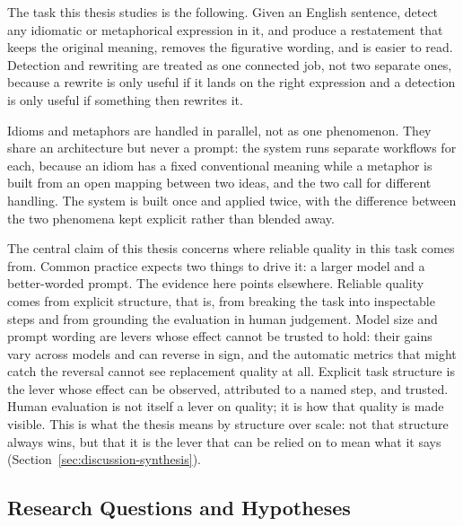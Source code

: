 The task this thesis studies is the following. Given an English sentence,
detect any idiomatic or metaphorical expression in it, and produce a
restatement that keeps the original meaning, removes the figurative wording,
and is easier to read. Detection and rewriting are treated as one connected
job, not two separate ones, because a rewrite is only useful if it lands on
the right expression and a detection is only useful if something then rewrites
it.

Idioms and metaphors are handled in parallel, not as one phenomenon. They
share an architecture but never a prompt: the system runs separate workflows
for each, because an idiom has a fixed conventional meaning while a metaphor
is built from an open mapping between two ideas, and the two call for
different handling. The system is built once and applied twice, with the
difference between the two phenomena kept explicit rather than blended away.

The central claim of this thesis concerns where reliable quality in this task
comes from. Common practice expects two things to drive it: a larger model and
a better-worded prompt. The evidence here points elsewhere. Reliable quality
comes from explicit structure, that is, from breaking the task into
inspectable steps and from grounding the evaluation in human judgement. Model
size and prompt wording are levers whose effect cannot be trusted to hold:
their gains vary across models and can reverse in sign, and the automatic
metrics that might catch the reversal cannot see replacement quality at all.
Explicit task structure is the lever whose effect can be observed, attributed
to a named step, and trusted. Human evaluation is not itself a lever on
quality; it is how that quality is made visible. This is what the thesis means
by structure over scale: not that structure always wins, but that it is the
lever that can be relied on to mean what it says
(Section~\ref{sec:discussion-synthesis}).

\subsection{Research Questions and Hypotheses}

